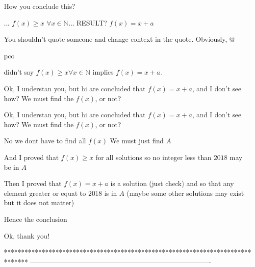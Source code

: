 \begin{solution}
	How you conclude this?
\begin{tcolorbox}
...
$f(x)\ge x$ $\forall x\in\mathbb N$... RESULT? $f(x)=x+a$ 
\end{tcolorbox}
\end{solution}



\begin{solution}
	You shouldn't quote someone and change context in the quote. Obviously, @\begin{bolded}pco\end{bolded} didn't say $f(x)\geq x \forall x\in\mathbb N$ implies $f(x)=x+a$.
\end{solution}



\begin{solution}
	Ok, I understan you, but hi are concluded that $f(x)=x+a$, and I don't see how? We must find the $f(x)$, or not?
\end{solution}



\begin{solution}
	\begin{tcolorbox}Ok, I understan you, but hi are concluded that $f(x)=x+a$, and I don't see how? We must find the $f(x)$, or not?\end{tcolorbox}
No we dont have to  find all $f(x)$
We must just find $A$

And I proved that $f(x)\ge x$ for all solutions so no integer less than $2018$ may be in $A$

Then I proved that $f(x)=x+a$ is a solution (just check) and so that any element greater or equat to $2018$ is in $A$
(maybe some other solutions may exist but it does not matter)

Hence the conclusion

\end{solution}



\begin{solution}
	Ok, thank you!
\end{solution}
*******************************************************************************
-------------------------------------------------------------------------------


